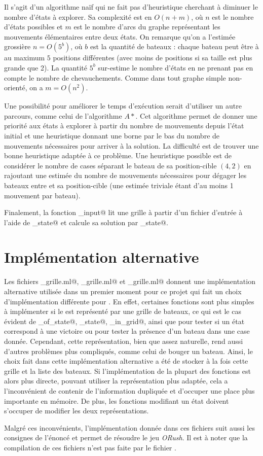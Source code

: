 \documentclass[a4paper,12pt]{article}
\begin{document}
Il s'agit d'un algorithme naïf qui ne fait pas d'heuristique cherchant à diminuer le nombre d'états à explorer. Sa complexité est en $O(n + m)$, où $n$ est le nombre d'états possibles et $m$ est le nombre d'arcs du graphe représentant les mouvements élémentaires entre deux états. On remarque qu'on a l'estimée grossière $n = O(5^b)$, où $b$ est la quantité de bateaux : chaque bateau peut être à au maximum $5$ positions différentes (avec moins de positions si sa taille est plus grande que 2). La quantité $5^b$ sur-estime le nombre d'états en ne prenant pas en compte le nombre de chevauchements. Comme dans tout graphe simple non-orienté, on a $m = O(n^2)$.

Une possibilité pour améliorer le temps d'exécution serait d'utiliser un autre parcours, comme celui de l'algorithme $A\ast$. Cet algorithme permet de donner une priorité aux états à explorer à partir du nombre de mouvements depuis l'état initial et une heuristique donnant une borne par le bas du nombre de mouvements nécessaires pour arriver à la solution. La difficulté est de trouver une bonne heuristique adaptée à ce problème. Une heuristique possible est de considérer le nombre de cases séparant le bateau \verb@A@ de sa position-cible $(4, 2)$ en rajoutant une estimée du nombre de mouvements nécessaires pour dégager les bateaux entre \verb@A@ et sa position-cible (une estimée triviale étant d'au moins 1 mouvement par bateau).

Finalement, la fonction \verb@solve_input@ lit une grille à partir d'un fichier d'entrée à l'aide de \verb@input_state@ et calcule sa solution par \verb@solve_state@.

\appendix

\section{Implémentation alternative}
\label{Append}

Les fichiers \verb@port_grille.ml@, \verb@moves_grille.ml@ et \verb@solver_grille.ml@ donnent une implémentation alternative utilisée dans un premier moment pour ce projet qui fait un choix d'implémentation différente pour \verb@state@. En effet, certaines fonctions sont plus simples à implémenter si le \verb@state@ est représenté par une grille de bateaux, ce qui est le cas évident de \verb@grid_of_state@, \verb@output_state@, \verb@boat_in_grid@, ainsi que pour tester si un état correspond à une victoire ou pour tester la présence d'un bateau dans une case donnée. Cependant, cette représentation, bien que assez naturelle, rend aussi d'autres problèmes plus compliqués, comme celui de bouger un bateau. Ainsi, le choix fait dans cette implémentation alternative a été de stocker à la fois cette grille et la liste des bateaux. Si l'implémentation de la plupart des fonctions est alors plus directe, pouvant utiliser la représentation plus adaptée, cela a l'inconvénient de contenir de l'information dupliquée et d'occuper une place plus importante en mémoire. De plus, les fonctions modifiant un état doivent s'occuper de modifier les deux représentations.

Malgré ces inconvénients, l'implémentation donnée dans ces fichiers suit aussi les consignes de l'énoncé et permet de résoudre le jeu \emph{ORush}. Il est à noter que la compilation de ces fichiers n'est pas faite par le fichier \verb@Makefile@.
\end{document}
